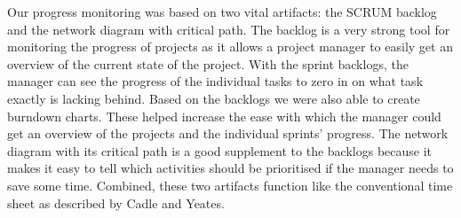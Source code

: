 Our progress monitoring was based on two vital artifacts: the SCRUM backlog and the network diagram with critical path. The backlog is a very strong tool for monitoring the progress of projects as it allows a project manager to easily get an overview of the current state of the project. With the sprint backlogs, the manager can see the progress of the individual tasks to zero in on what task exactly is lacking behind. Based on the backlogs we were also able to create burndown charts. These helped increase the ease with which the manager could get an overview of the projects and the individual sprints' progress. The network diagram with its critical path is a good supplement to the backlogs because it makes it easy to tell which activities should be prioritised if the manager needs to save some time. Combined, these two artifacts function like the conventional time sheet as described by Cadle and Yeates.

